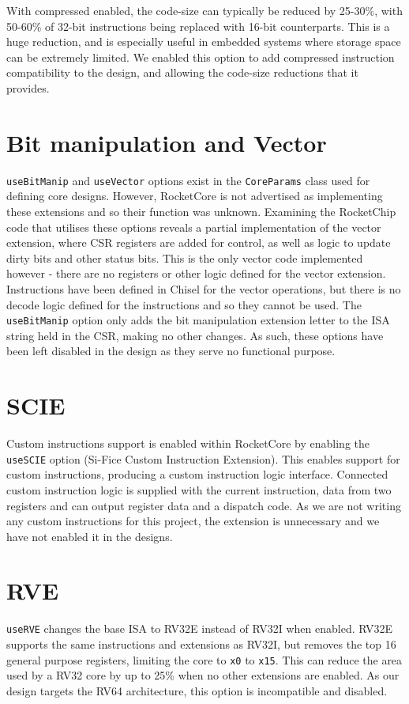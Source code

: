 With compressed enabled, the code-size can typically be reduced by 25-30\%, with 50-60\% of 32-bit instructions being replaced with 16-bit counterparts. This is a huge reduction, and is especially useful in embedded systems where storage space can be extremely limited. We enabled this option to add compressed instruction compatibility to the design, and allowing the code-size reductions that it provides.

\section{Bit manipulation and Vector}
\texttt{useBitManip} and \texttt{useVector} options exist in the \texttt{CoreParams} class used for defining core designs. However, RocketCore is not advertised as implementing these extensions and so their function was unknown. Examining the RocketChip code that utilises these options reveals a partial implementation of the vector extension, where CSR registers are added for control, as well as logic to update dirty bits and other status bits. This is the only vector code implemented however - there are no registers or other logic defined for the vector extension. Instructions have been defined in Chisel for the vector operations, but there is no decode logic defined for the instructions and so they cannot be used. The \texttt{useBitManip} option only adds the bit manipulation extension letter to the ISA string held in the CSR, making no other changes. As such, these options have been left disabled in the design as they serve no functional purpose.

\section{SCIE}
Custom instructions support is enabled within RocketCore by enabling the \texttt{useSCIE} option (Si-Fice Custom Instruction Extension). This enables support for custom instructions, producing a custom instruction logic interface. Connected custom instruction logic is supplied with the current instruction, data from two registers and can output register data and a dispatch code. As we are not writing any custom instructions for this project, the extension is unnecessary and we have not enabled it in the designs.

\section{RVE}
\texttt{useRVE} changes the base ISA to RV32E instead of RV32I when enabled. RV32E supports the same instructions and extensions as RV32I, but removes the top 16 general purpose registers, limiting the core to \texttt{x0} to \texttt{x15}. This can reduce the area used by a RV32 core by up to 25\% when no other extensions are enabled. As our design targets the RV64 architecture, this option is incompatible and disabled.

